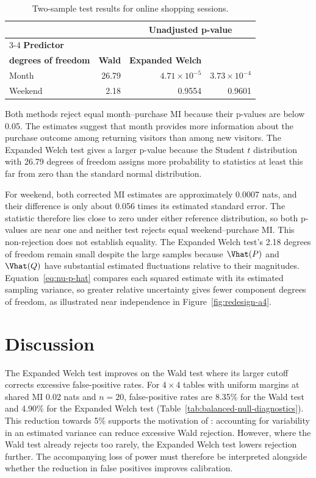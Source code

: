 \begin{table}[H]
\centering
\caption{Two-sample test results for online shopping sessions.}
\label{tab:shoppers-test-results}
\thesistableformat
\begin{tabular*}{0.92\textwidth}{@{\extracolsep{\fill}}lrrr@{}}
\toprule
 & & \multicolumn{2}{c}{\textbf{Unadjusted p-value}}\\
\cmidrule(lr){3-4}
\textbf{Predictor} & \shortstack[r]{\textbf{Expanded Welch}\\\textbf{degrees of freedom}}
 & \textbf{Wald} & \textbf{Expanded Welch}\\
\midrule
Month & 26.79 & \(4.71\times10^{-5}\) & \(3.73\times10^{-4}\)\\
\addlinespace[0.35em]
Weekend & 2.18 & 0.9554 & 0.9601\\
\bottomrule
\end{tabular*}
\end{table}
\endgroup

Both methods reject equal month--purchase MI because their p-values
are below 0.05. The estimates suggest that month provides more information
about the purchase outcome among returning visitors than among new visitors.
The Expanded Welch test gives a larger p-value because the Student
\(t\) distribution with 26.79 degrees of freedom assigns more probability
to statistics at least this far from zero than the standard normal
distribution.

For weekend, both corrected MI estimates are approximately 0.0007 nats,
and their difference is only about 0.056 times its estimated standard
error. The statistic therefore lies close to zero under either reference
distribution, so both p-values are near one and neither test rejects
equal weekend--purchase MI. This non-rejection does not establish equality. The Expanded Welch test's 2.18 degrees of freedom remain small despite the large samples because \(\Vhat(P)\) and
\(\Vhat(Q)\) have substantial estimated fluctuations relative to
their magnitudes. Equation~\eqref{eq:nu-p-hat} compares each squared estimate with its
estimated sampling variance, so greater relative uncertainty gives fewer
component degrees of freedom, as illustrated near independence in
Figure~\ref{fig:redesign-a4}.

\section{Discussion}
\label{sec:results-discussion}

The Expanded Welch test improves on the Wald test where its larger cutoff corrects
excessive false-positive rates. For \(4\times4\) tables with uniform margins
at shared MI 0.02 nats and \(n=20\), false-positive rates are 8.35\% for the
Wald test and 4.90\% for the Expanded Welch test
(Table~\ref{tab:balanced-null-diagnostics}). This reduction towards 5\%
supports the motivation of \citet{panwall2002}: accounting for variability
in an estimated variance can reduce excessive Wald rejection. However,
where the Wald test already rejects too rarely, the Expanded Welch test lowers rejection
further. The accompanying loss of power must therefore
be interpreted alongside whether the reduction in false positives improves
calibration.


